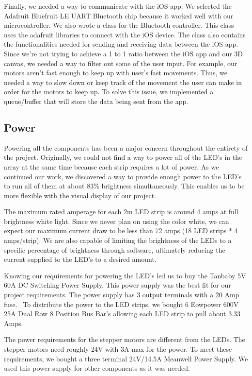 \documentclass[12pt]{article}
\begin{document}
Finally, we needed a way to communicate with the iOS app. We selected the Adafruit Bluefruit LE UART Bluetooth chip because it worked well with our microcontroller. We also wrote a class for the Bluetooth controller. This class uses the adafruit libraries to connect with the iOS device. The class also contains the functionalities needed for sending and receiving data between the iOS app. Since we’re not trying to achieve a 1 to 1 ratio between the iOS app and our 3D canvas, we needed a way to filter out some of the user input. For example, our motors aren’t fast enough to keep up with user’s fast movements. Thus, we needed a way to slow down or keep track of the movement the user can make in order for the motors to keep up. To solve this issue, we implemented a queue/buffer that will store the data being sent from the app.

\subsection{Power}
Powering all the components has been a major concern throughout the entirety of the project. Originally, we could not find a way to power all of the LED’s in the array at the same time because each strip requires a lot of power. As we continued our work, we discovered a way to provide enough power to the LED’s to run all of them at about 83\% brightness simultaneously. This enables us to be more flexible with the visual display of our project. 

The maximum rated amperage for each 2m LED strip is around 4 amps at full brightness white light. Since we never plan on using the color white, we can expect our maximum current draw to be less than 72 amps (18 LED strips * 4 amps/strip). We are also capable of limiting the brightness of the LEDs to a specific percentage of brightness through software, ultimately reducing the current supplied to the LED’s to a desired amount.

Knowing our requirements for powering the LED’s led us to buy the Tanbaby 5V 60A DC Switching Power Supply. This power supply was the best fit for our project requirements. The power supply has 3 output terminals with a 20 Amp fuse.  To distribute the power to the LED strips, we bought 6 Eowpower 600V 25A Dual Row 8 Position Bus Bar’s allowing each LED strip to pull about 3.33 Amps.

The power requirements for the stepper motors are different from the LEDs. The stepper motors need roughly 24V with 3A max for the power. To meet these requirements, we bought a three terminal 24V/14.5A Meanwell Power Supply. We used this power supply for other components as it was needed.
\end{document}
